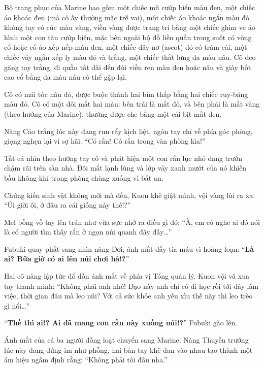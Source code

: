 \documentclass[../main.tex]{subfiles}
\begin{document}
Bộ trang phục của Marine bao gồm một chiếc mũ cướp biển màu đen, một chiếc áo khoác đen (mà cô ấy thường mặc trễ vai), một chiếc áo khoác ngắn màu đỏ không tay có cúc màu vàng, viền vàng được trang trí bằng một chiếc ghim ve áo hình một con tàu cướp biển, mặc bên ngoài bộ đồ liền quần trong suốt có vòng cổ hoặc cổ áo xếp nếp màu đen, một chiếc dây nơ (ascot) đỏ có trâm cài, một chiếc váy ngắn xếp ly màu đỏ và trắng, một chiếc thắt lưng da màu nâu. Cô đeo găng tay trắng, đi quần tất dài đến đùi viền ren màu đen hoặc nâu và giày bốt cao cổ bằng da màu nâu có thể gập lại.

Cô có mái tóc nâu đỏ, được buộc thành hai bím thấp bằng hai chiếc ruy-băng màu đỏ. Cô có một đôi mắt hai màu: bên trái là mắt đỏ, và bên phải là mắt vàng (theo hướng của Marine), thường được che bằng một cái bịt mắt đen.

\chrint

Nàng Cáo trắng lúc này đang run rẩy kịch liệt, ngón tay chỉ về phía góc phòng, giọng nghẹn lại vì sợ hãi: ``Có rắn! Có rắn trong văn phòng kìa!''

Tất cả nhìn theo hướng tay cô và phát hiện một con rắn lục nhỏ đang trườn chậm rãi trên sàn nhà. Đôi mắt lạnh lùng và lớp vảy xanh mướt của nó khiến bầu không khí trong phòng chùng xuống vì bất an.


Chứng kiến sinh vật không mời mà đến, Kuon khẽ giật mình, vội vàng lùi ra xa: ``Úi giời ôi, ở đâu ra cái giống này thế!?''

Mel bỗng vỗ tay lên trán như vừa sực nhớ ra điều gì đó: ``À, em có nghe ai đó nói là có người tìm thấy rắn ở ngọn núi quanh đây đấy\dots''

Fubuki quay phắt sang nhìn nàng Dơi, ánh mắt đầy tia máu vì hoảng loạn: ``\textbf{Là ai? Bữa giờ có ai lên núi chơi hả!?}''

Hai cô nàng lập tức đổ dồn ánh mắt về phía vị Tổng quản lý. Kuon vội vã xua tay thanh minh: ``Không phải anh nhé! Dạo này anh chỉ có đi học rồi tới đây làm việc, thời gian đâu mà leo núi? Với cả sức khỏe anh yếu xìu thế này thì leo trèo gì nổi\dots''

``\textbf{Thế thì ai!? Ai đã mang con rắn này xuống núi!?}'' Fubuki gào lên.

Ánh mắt của cả ba người đồng loạt chuyển sang Marine. Nàng Thuyền trưởng lúc này đang đứng im như phỗng, hai bàn tay khẽ đan vào nhau tạo thành một ám hiệu ngầm định rằng: ``Không phải tôi đâu nha.''

\end{document}
